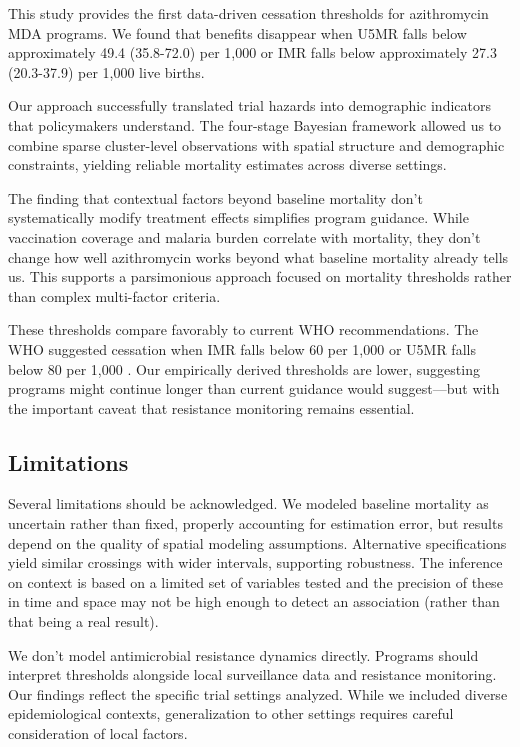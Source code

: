 \documentclass[11pt]{article}\usepackage[]{graphicx}\usepackage[]{xcolor}
\begin{document}
This study provides the first data-driven cessation thresholds for azithromycin MDA programs. We found that benefits disappear when U5MR falls below approximately 49.4 (35.8-72.0) per 1,000 or IMR falls below approximately 27.3 (20.3-37.9) per 1,000 live births.

Our approach successfully translated trial hazards into demographic indicators that policymakers understand. The four-stage Bayesian framework allowed us to combine sparse cluster-level observations with spatial structure and demographic constraints, yielding reliable mortality estimates across diverse settings.

The finding that contextual factors beyond baseline mortality don't systematically modify treatment effects simplifies program guidance. While vaccination coverage and malaria burden correlate with mortality, they don't change how well azithromycin works beyond what baseline mortality already tells us. This supports a parsimonious approach focused on mortality thresholds rather than complex multi-factor criteria.

These thresholds compare favorably to current WHO recommendations. The WHO suggested cessation when IMR falls below 60 per 1,000 or U5MR falls below 80 per 1,000 \citep{who2020guidelines}. Our empirically derived thresholds are lower, suggesting programs might continue longer than current guidance would suggest---but with the important caveat that resistance monitoring remains essential.

\subsection{Limitations}

Several limitations should be acknowledged. We modeled baseline mortality as uncertain rather than fixed, properly accounting for estimation error, but results depend on the quality of spatial modeling assumptions. Alternative specifications yield similar crossings with wider intervals, supporting robustness. The inference on context is based on a limited set of variables tested and the precision of these in time and space may not be high enough to detect an association (rather than that being a real result).

We don't model antimicrobial resistance dynamics directly. Programs should interpret thresholds alongside local surveillance data and resistance monitoring. Our findings reflect the specific trial settings analyzed. While we included diverse epidemiological contexts, generalization to other settings requires careful consideration of local factors.


\clearpage


\end{document}
